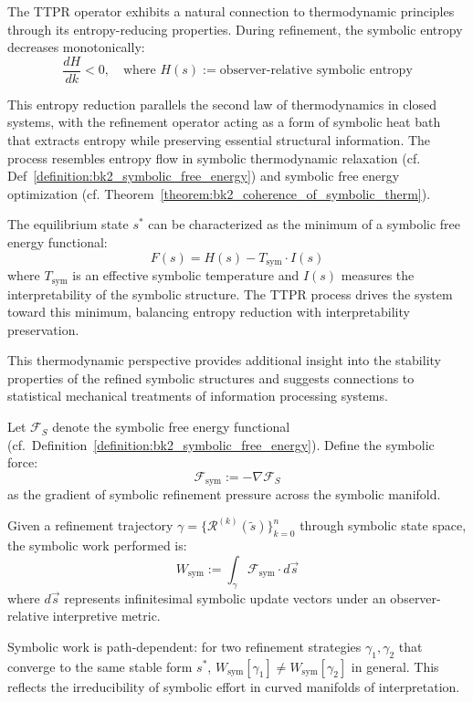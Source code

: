 \begin{remark}
\label{remark:bk4_ttpr_entropy}
The TTPR operator exhibits a natural connection to thermodynamic principles through its entropy-reducing properties. During refinement, the symbolic entropy decreases monotonically:
\[
\frac{dH}{dk} < 0, \quad \text{where } H(s) := \text{observer-relative symbolic entropy}
\]

This entropy reduction parallels the second law of thermodynamics in closed systems, with the refinement operator acting as a form of symbolic heat bath that extracts entropy while preserving essential structural information. The process resembles entropy flow in symbolic thermodynamic relaxation (cf. Def~\ref{definition:bk2_symbolic_free_energy}) and symbolic free energy optimization (cf. Theorem~\ref{theorem:bk2_coherence_of_symbolic_therm}).

The equilibrium state $s^*$ can be characterized as the minimum of a symbolic free energy functional:
\[
F(s) = H(s) - T_{\text{sym}} \cdot I(s)
\]
where $T_{\text{sym}}$ is an effective symbolic temperature and $I(s)$ measures the interpretability of the symbolic structure. The TTPR process drives the system toward this minimum, balancing entropy reduction with interpretability preservation.

This thermodynamic perspective provides additional insight into the stability properties of the refined symbolic structures and suggests connections to statistical mechanical treatments of information processing systems.
\end{remark}

\begin{definition}
\label{definition:bk4_symbolic_work_functional}
Let \( \mathcal{F}_S \) denote the symbolic free energy functional (cf.~Definition~\ref{definition:bk2_symbolic_free_energy}). Define the symbolic force:
\[
\mathcal{F}_{\text{sym}} := -\nabla \mathcal{F}_S
\]
as the gradient of symbolic refinement pressure across the symbolic manifold.

Given a refinement trajectory \( \gamma = \{\mathcal{R}^{(k)}(\tilde{s})\}_{k=0}^{n} \) through symbolic state space, the symbolic work performed is:
\[
W_{\text{sym}} := \int_{\gamma} \mathcal{F}_{\text{sym}} \cdot d\vec{s}
\]
where \( d\vec{s} \) represents infinitesimal symbolic update vectors under an observer-relative interpretive metric.
\end{definition}

\begin{proposition}
\label{proposition:bk4_symbolic_work_path_dependence}
Symbolic work is path-dependent: for two refinement strategies \( \gamma_1, \gamma_2 \) that converge to the same stable form \( s^* \), \( W_{\text{sym}}[\gamma_1] \neq W_{\text{sym}}[\gamma_2] \) in general. This reflects the irreducibility of symbolic effort in curved manifolds of interpretation.
\end{proposition}


